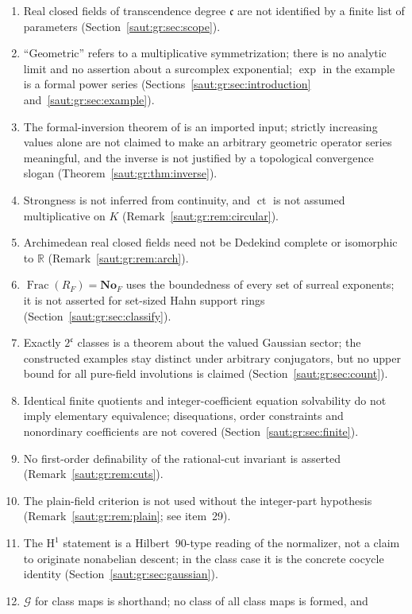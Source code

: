 \documentclass[11pt]{article}
\theoremstyle{definition}
\theoremstyle{remark}
\newcommand{\No}{\mathbf{No}}
\newcommand{\R}{\mathbb R}
\newcommand{\ct}{\operatorname{ct}}
\newcommand{\Frac}{\operatorname{Frac}}
\newcommand{\cc}{\mathfrak c}
\numberwithin{equation}{section}
\begin{document}
\begin{enumerate}[label=\arabic*.,leftmargin=2.2em]
\item Real closed fields of transcendence degree $\cc$ are not identified by a finite list of
parameters (Section~\ref{saut:gr:sec:scope}).
\item ``Geometric'' refers to a multiplicative symmetrization; there is no analytic limit and
no assertion about a surcomplex exponential; $\exp$ in the example is a formal power series
(Sections~\ref{saut:gr:sec:introduction} and~\ref{saut:gr:sec:example}).
\item The formal-inversion theorem of \cite{BKKS} is an imported input; strictly increasing
values alone are not claimed to make an arbitrary geometric operator series meaningful, and
the inverse is not justified by a topological convergence slogan
(Theorem~\ref{saut:gr:thm:inverse}).
\item Strongness is not inferred from continuity, and $\ct$ is not assumed multiplicative on
$K$ (Remark~\ref{saut:gr:rem:circular}).
\item Archimedean real closed fields need not be Dedekind complete or isomorphic to $\R$
(Remark~\ref{saut:gr:rem:arch}).
\item $\Frac(R_F)=\No_F$ uses the boundedness of every set of surreal exponents; it is not
asserted for set-sized Hahn support rings (Section~\ref{saut:gr:sec:classify}).
\item Exactly $2^{\cc}$ classes is a theorem about the valued Gaussian sector; the constructed
examples stay distinct under arbitrary conjugators, but no upper bound for all pure-field
involutions is claimed (Section~\ref{saut:gr:sec:count}).
\item Identical finite quotients and integer-coefficient equation solvability do not imply
elementary equivalence; disequations, order constraints and nonordinary coefficients are not
covered (Section~\ref{saut:gr:sec:finite}).
\item No first-order definability of the rational-cut invariant is asserted
(Remark~\ref{saut:gr:rem:cuts}).
\item The plain-field criterion is not used without the integer-part hypothesis
(Remark~\ref{saut:gr:rem:plain}; see item~29).
\item The $\mathrm H^1$ statement is a Hilbert~90-type reading of the normalizer, not a claim
to originate nonabelian descent; in the class case it is the concrete cocycle identity
(Section~\ref{saut:gr:sec:gaussian}).
\item $\mathcal G$ for class maps is shorthand; no class of all class maps is formed, and

\end{enumerate}
\end{document}
